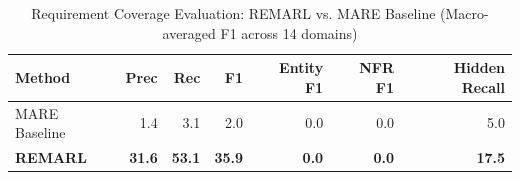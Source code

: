 \begin{table}[t]
\centering
\caption{Requirement Coverage Evaluation: REMARL vs. MARE Baseline (Macro-averaged F1 across 14 domains)}
\label{tab:eval_results}
\begin{tabular}{lrrrrrr}
\toprule
Method & Prec & Rec & F1 & Entity F1 & NFR F1 & Hidden Recall \\
\midrule
MARE Baseline & 1.4 & 3.1 & 2.0 & 0.0 & 0.0 & 5.0 \\
\textbf{REMARL} & \textbf{31.6} & \textbf{53.1} & \textbf{35.9} & \textbf{0.0} & \textbf{0.0} & \textbf{17.5} \\
\bottomrule
\end{tabular}
\end{table}